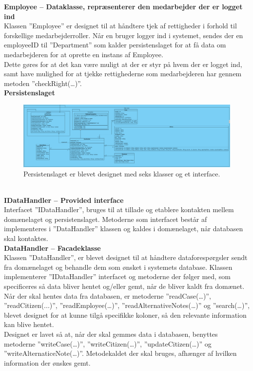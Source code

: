 \textbf{Employee – Dataklasse, repræsenterer den medarbejder der er logget ind}\\
Klassen ”Employee” er designet til at håndtere tjek af rettigheder i forhold til forskellige medarbejderroller. Når en bruger logger ind i systemet, sendes der en employeeID til ”Department” som kalder persistenslaget for at få data om medarbejderen for at oprette en instans af Employee.\\
Dette gøres for at det kan være muligt at der er styr på hvem der er logget ind, samt have mulighed for at tjekke rettighederne som medarbejderen har gennem metoden ”checkRight(…)”.\\
\textbf{Persistenslaget}
\begin{figure}[htb!]
  \includegraphics[width = \linewidth]{./PNG/design/datalagKlassediagram.PNG} 
  \caption{Persistenslaget er blevet designet med seks klasser og et interface.}
  \label{fig:2dataklassediagram}
\end{figure}
\\ 
\textbf{IDataHandler – Provided interface} \\
Interfacet ”IDataHandler”, bruges til at tillade og etablere kontakten mellem domænelaget og persistenslaget. Metoderne som interfacet består af implementeres i ”DataHandler” klassen og kaldes i domænelaget, når databasen skal kontaktes.\\
\textbf{DataHandler – Facadeklasse}\\
Klassen ”DataHandler”, er blevet designet til at håndtere dataforespørgsler sendt fra domænelaget og behandle dem som ønsket i systemets database. Klassen implementerer ”IDataHandler” interfacet og metoderne der følger med, som specificeres så data bliver hentet og/eller gemt, når de bliver kaldt fra domænet.\\
Når der skal hentes data fra databasen, er metoderne ”readCase(…)”, ”readCitizen(...)”, ”readEmployee(…)”, ”readAlternativeNotes(…)” og ”search(…)”, blevet designet for at kunne tilgå specifikke koloner, så den relevante information kan blive hentet. \\
Designet er lavet så at, når der skal gemmes data i databasen, benyttes metoderne ”writeCase(…)”, ”writeCitizen(…)”, ”updateCitizen(…)” og ”writeAlternaticeNote(…)”. Metodekaldet der skal bruges, afhænger af hvilken information der ønskes gemt. \\
